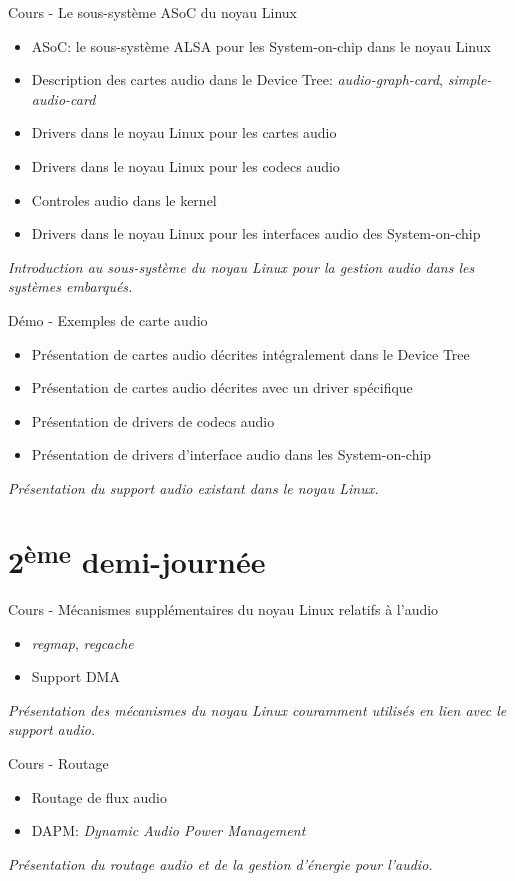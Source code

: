 \documentclass[a4paper,12pt,obeyspaces,spaces,hyphens]{article}
\begin{document}
\feagendatwocolumn
{Cours - Le sous-système ASoC du noyau Linux}
{
  \begin{itemize}
  \item ASoC: le sous-système ALSA pour les System-on-chip dans le noyau Linux
  \item Description des cartes audio dans le Device Tree: {\em
      audio-graph-card}, {\em simple-audio-card}
  \item Drivers dans le noyau Linux pour les cartes audio
  \item Drivers dans le noyau Linux pour les codecs audio
  \item Controles audio dans le kernel
  \item Drivers dans le noyau Linux pour les interfaces audio des
    System-on-chip
  \end{itemize}
  \vspace{0.5em}
  {\em Introduction au sous-système du noyau Linux pour la gestion audio dans les systèmes embarqués.}
}
{Démo - Exemples de carte audio}
{
  \begin{itemize}
  \item Présentation de cartes audio décrites intégralement dans le Device Tree
  \item Présentation de cartes audio décrites avec un driver spécifique
  \item Présentation de drivers de codecs audio
  \item Présentation de drivers d'interface audio dans les
    System-on-chip
  \end{itemize}
  \vspace{0.5em}
  {\em Présentation du support audio existant dans le noyau Linux.}
}

\section{2\textsuperscript{ème} demi-journée}

\feagendatwocolumn
{Cours - Mécanismes supplémentaires du noyau Linux relatifs à l'audio}
{
  \begin{itemize}
  \item {\em regmap}, {\em regcache}
  \item Support DMA
  \end{itemize}
  \vspace{0.5em}
  {\em Présentation des mécanismes du noyau Linux couramment utilisés en lien avec le support audio.}
}
{Cours - Routage}
{
  \begin{itemize}
  \item Routage de flux audio
  \item DAPM: {\em Dynamic Audio Power Management}
  \end{itemize}
  \vspace{0.5em}
  {\em Présentation du routage audio et de la gestion d'énergie pour l'audio.}
}
\end{document}

